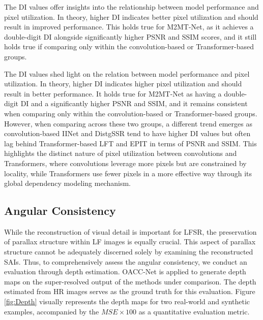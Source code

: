 The DI values offer insights into the relationship between model performance and pixel utilization. In theory, higher DI indicates better pixel utilization and should result in improved performance. This holds true for M2MT-Net, as it achieves a double-digit DI alongside significantly higher PSNR and SSIM scores, and it still holds true if comparing only within the convolution-based or Transformer-based groups.

The DI values shed light on the relation between model performance and pixel utilization. In theory, higher DI indicates higher pixel utilization and should result in better performance. It holds true for M2MT-Net as having a double-digit DI and a significantly higher PSNR and SSIM, and it remains consistent when comparing only within the convolution-based or Transformer-based groups. However, when comparing across these two groups, a different trend emerges as convolution-based IINet and DistgSSR tend to have higher DI values but often lag behind Transformer-based LFT and EPIT in terms of PSNR and SSIM. This highlights the distinct nature of pixel utilization between convolutions and Transformers, where convolutions leverage more pixels but are constrained by locality, while Transformers use fewer pixels in a more effective way through its global dependency modeling mechanism.



\subsection{Angular Consistency}
While the reconstruction of visual detail is important for LFSR, the preservation of parallax structure within LF images is equally crucial. This aspect of parallax structure cannot be adequately discerned solely by examining the reconstructed SAIs. Thus, to comprehensively assess the angular consistency, we conduct an evaluation through depth estimation. OACC-Net \cite{wangOACCNet_CVPR2022} is applied to generate depth maps on the super-resolved output of the methods under comparison. The depth estimated from HR images serves as the ground truth for this evaluation. Figure \ref{fig:Depth} visually represents the depth maps for two real-world and synthetic examples, accompanied by the $MSE\times100$ as a quantitative evaluation metric.

